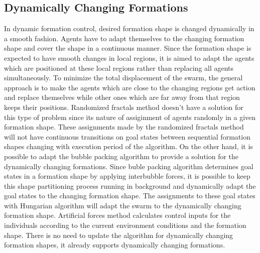 \subsection{Dynamically Changing Formations} \label{dynamical_ref}
In dynamic formation control, desired formation shape is changed dynamically in a smooth fashion. Agents have to adapt themselves to the changing formation shape and cover the shape in a continuous manner. Since the formation shape is expected to have smooth changes in local regions, it is aimed to adapt the agents which are positioned at these local regions rather than replacing all agents simultaneously. To minimize the total displacement of the swarm, the general approach is to make the agents which are close to the changing regions get action and replace themselves while other ones which are far away from that region keeps their positions. Randomized fractals method doesn't have a solution for this type of problem since its nature of assiginment of agents randomly in a given formation shape. These assignments made by the randomized fractals method will not have continuous transitions on goal states between sequential formation shapes changing with execution period of the algorithm. On the other hand, it is possible to adapt the bubble packing algorithm to provide a solution for the dynamically changing formations. Since buble packing algorithm determines goal states in a formation shape by applying interbubble forces, it is possible to keep this shape partitioning process running in background and dynamically adapt the goal states to the changing formation shape. The assignments to these goal states with Hungarian algorithm will adapt the swarm to the dynamically changing formation shape. Artificial forces method calculates control inputs for the individuals according to the current environment conditions and the formation shape. There is no need to update the algorithm for dynamically changing formation shapes, it already supports dynamically changing formations. 
		 
